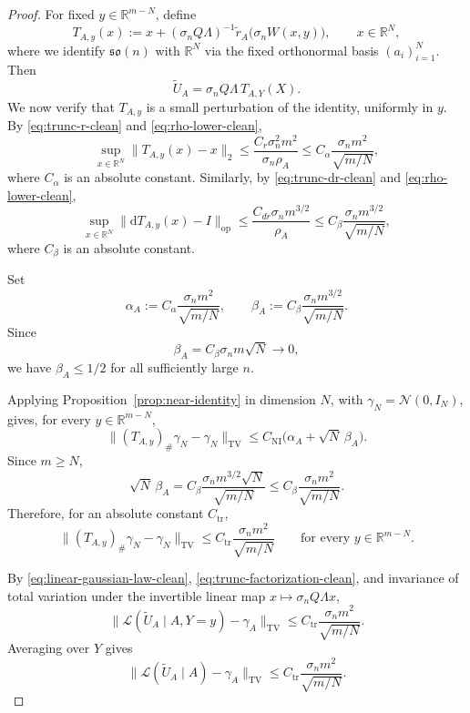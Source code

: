 \documentclass[11pt, reqno]{amsart}
\numberwithin{equation}{section}
\theoremstyle{remark}
\newcommand{\R}{\mathbb{R}}
\newcommand{\1}{\mathbf{1}}
\newcommand{\so}{\mathfrak{so}}
\newcommand{\op}{\mathrm{op}}
\newcommand{\Law}{\mathcal{L}}
\newcommand{\TV}{\mathrm{TV}}
\newcommand{\dd}{\mathrm{d}}
\begin{document}
\begin{proof}
For fixed $y\in\R^{m-N}$, define
\[
T_{A,y}(x)
:=
x+(\sigma_n Q\Lambda)^{-1}
\widetilde r_A\bigl(\sigma_n W(x,y)\bigr),
\qquad x\in\R^N,
\]
where we identify $\so(n)$ with $\R^N$ via the fixed orthonormal basis $(a_i)_{i=1}^N$.
Then
\begin{equation}
\label{eq:trunc-factorization-clean}
\widetilde U_A
=
\sigma_n Q\Lambda\,T_{A,Y}(X).
\end{equation}
We now verify that $T_{A,y}$ is a small perturbation of the identity, uniformly
in $y$. By \eqref{eq:trunc-r-clean} and \eqref{eq:rho-lower-clean},
\[
\sup_{x\in\R^N}\|T_{A,y}(x)-x\|_2
\le
\frac{C_r\sigma_n^2m^2}{\sigma_n\rho_A}
\le
C_\alpha\frac{\sigma_n m^2}{\sqrt{m/N}},
\]
where $C_\alpha$ is an absolute constant. Similarly, by
\eqref{eq:trunc-dr-clean} and \eqref{eq:rho-lower-clean},
\[
\sup_{x\in\R^N}\|\dd T_{A,y}(x)-I\|_{\op}
\le
\frac{C_{dr}\sigma_n m^{3/2}}{\rho_A}
\le
C_\beta\frac{\sigma_n m^{3/2}}{\sqrt{m/N}},
\]
where $C_\beta$ is an absolute constant.

Set
\[
\alpha_A:=C_\alpha\frac{\sigma_n m^2}{\sqrt{m/N}},
\qquad
\beta_A:=C_\beta\frac{\sigma_n m^{3/2}}{\sqrt{m/N}}.
\]
Since
\[
\beta_A=C_\beta\sigma_n m\sqrt N\to0,
\]
we have $\beta_A\le 1/2$ for all sufficiently large $n$.

Applying Proposition~\ref{prop:near-identity} in dimension $N$, with
$\gamma_N=\mathcal N(0,I_N)$, gives, for every $y\in\R^{m-N}$,
\[
\|(T_{A,y})_\#\gamma_N-\gamma_N\|_{\TV}
\le
C_{\mathrm{NI}}\bigl(\alpha_A+\sqrt N\,\beta_A\bigr).
\]
Since $m\ge N$,
\[
\sqrt N\,\beta_A
=
C_\beta\frac{\sigma_n m^{3/2}\sqrt N}{\sqrt{m/N}}
\le
C_\beta\frac{\sigma_n m^2}{\sqrt{m/N}}.
\]
Therefore, for an absolute constant $C_{\mathrm{tr}}$,
\begin{equation}
\label{eq:trunc-gaussian-clean}
\|(T_{A,y})_\#\gamma_N-\gamma_N\|_{\TV}
\le
C_{\mathrm{tr}}\frac{\sigma_n m^2}{\sqrt{m/N}}
\qquad\text{for every }y\in\R^{m-N}.
\end{equation}

By \eqref{eq:linear-gaussian-law-clean}, \eqref{eq:trunc-factorization-clean},
and invariance of total variation under the invertible linear map $x\mapsto \sigma_n Q\Lambda x$,
\[
\|\Law(\widetilde U_A\mid A,Y=y)-\gamma_A\|_{\TV}
\le
C_{\mathrm{tr}}\frac{\sigma_n m^2}{\sqrt{m/N}}.
\]
Averaging over $Y$ gives
\begin{equation}
\label{eq:tildeUA-to-gammaA-clean}
\|\Law(\widetilde U_A\mid A)-\gamma_A\|_{\TV}
\le
C_{\mathrm{tr}}\frac{\sigma_n m^2}{\sqrt{m/N}}.
\end{equation}


\end{proof}
\end{document}
